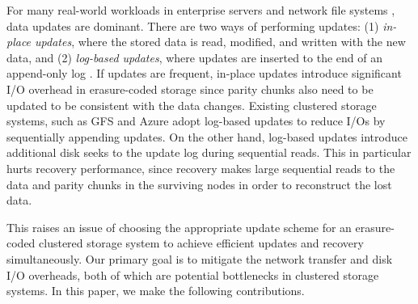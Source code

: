 For many real-world workloads in enterprise servers and network file systems
\cite{adams12,narayanan08}, data updates are dominant.  There are two ways of
performing updates: (1) {\em in-place updates}, where the stored data is read,
modified, and written with the new data, and (2) {\em log-based updates},
where updates are inserted to the end of an append-only log
\cite{rosenblum92}.  If updates are frequent, in-place updates introduce
significant I/O overhead in erasure-coded storage since parity chunks also
need to be updated to be consistent with the data changes.  Existing
clustered storage systems, such as GFS \cite{ghemawat03} and Azure 
\cite{calder11} adopt log-based updates to reduce I/Os by sequentially
appending updates.  On the other hand, log-based updates introduce additional
disk seeks to the update log during sequential reads.  This in particular
hurts recovery performance, since recovery makes large sequential reads to the
data and parity chunks in the surviving nodes in order to reconstruct the lost
data. 

This raises an issue of choosing the appropriate update scheme for an
erasure-coded clustered storage system to achieve efficient updates and
recovery simultaneously.  Our primary goal is to mitigate the network transfer
and disk I/O overheads, both of which are potential bottlenecks in clustered
storage systems.  In this paper, we make the following contributions.




